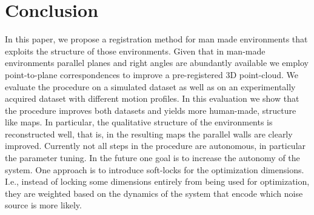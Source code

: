 \section{Conclusion}

In this paper, we propose a registration method for man made environments that exploits the structure of those environments. 
Given that in man-made environments parallel planes and right angles are abundantly available we employ point-to-plane correspondences to improve a pre-registered 3D point-cloud. 
We evaluate the procedure on a simulated dataset as well as on an experimentally acquired dataset with different motion profiles. 
In this evaluation we show that the procedure improves both datasets and yields more human-made, structure like maps. 
In particular, the qualitative structure of the environments is reconstructed well, that is, in the resulting maps the parallel walls are clearly improved.
Currently not all steps in the procedure are autonomous, in particular the parameter tuning. 
In the future one goal is to increase the autonomy of the system.
One approach is to introduce soft-locks for the optimization dimensions.
I.e., instead of locking some dimensions entirely from being used for optimization, they are weighted based on the dynamics of the system that encode which noise source is more likely.  

